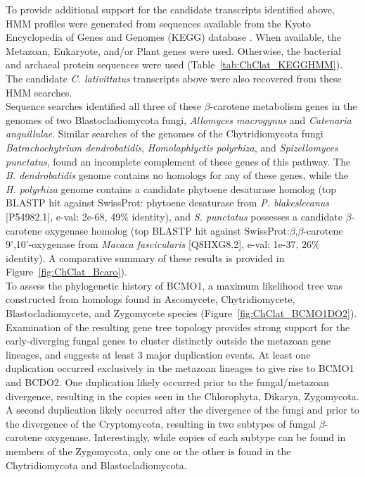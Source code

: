 \indent To provide additional support for the candidate transcripts identified above, HMM profiles were generated from sequences available from the Kyoto Encyclopedia of Genes and Genomes (KEGG) database \cite{Kanehisa2000,Kanehisa2014}. When available, the Metazoan, Eukaryote, and/or Plant genes were used. Otherwise, the bacterial and archaeal protein sequences were used (Table~\ref{tab:ChClat_KEGGHMM}). The candidate \textit{C. lativittatus} transcripts above were also recovered from these HMM searches. \\
\indent Sequence searches identified all three of these $\beta$-carotene metabolism genes in the genomes of two Blastocladiomycota fungi, \textit{Allomyces macrogynus} and \textit{Catenaria anguillulae}. Similar searches of the genomes of the Chytridiomycota fungi \textit{Batrachochytrium dendrobatidis}, \textit{Homolaphlyctis polyrhiza}, and \textit{Spizellomyces punctatus}, found an incomplete complement of these genes of this pathway. The \textit{B. dendrobatidis} genome contains no homologs for any of these genes, while the \textit{H. polyrhiza} genome contains a candidate phytoene desaturase homolog (top BLASTP hit against SwissProt: phytoene desaturase from \textit{P. blakesleeanus} [P54982.1], e-val: 2e-68, 49\% identity), and \textit{S. punctatus} possesses a candidate $\beta$-carotene oxygenase homolog (top BLASTP hit against SwissProt:$\beta$,$\beta$-carotene 9',10'-oxygenase from \textit{Macaca fascicularis} [Q8HXG8.2], e-val: 1e-37, 26\% identity). A comparative summary of these results is provided in Figure~\ref{fig:ChClat_Bcaro}). \\
\indent To assess the phylogenetic history of BCMO1, a maximum likelihood tree was constructed from homologs found in Ascomycete, Chytridiomycete, Blastocladiomycete, and Zygomycete species (Figure~\ref{fig:ChClat_BCMO1DO2}). Examination of the resulting gene tree topology provides strong support for the early-diverging fungal genes to cluster distinctly outside the metazoan gene lineages, and suggests at least 3 major duplication events. At least one duplication occurred exclusively in the metazoan lineages to give rise to BCMO1 and BCDO2. One duplication likely occurred prior to the fungal/metazoan divergence, resulting in the copies seen in the Chlorophyta, Dikarya, Zygomycota. A second duplication likely occurred after the divergence of the fungi and prior to the divergence of the Cryptomycota, resulting in two subtypes of fungal $\beta$-carotene oxygenase. Interestingly, while copies of each subtype can be found in members of the Zygomycota, only one or the other is found in the Chytridiomycota and Blastocladiomycota.\\
